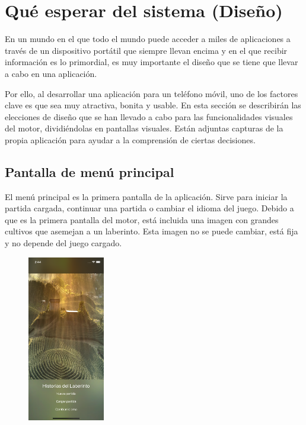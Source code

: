 \newpage
 
\section{Qué esperar del sistema (Diseño)} \label{designSection}
En un mundo en el que todo el mundo puede acceder a miles de aplicaciones a través de un dispositivo portátil que siempre llevan encima y en el que recibir información es lo primordial, es muy importante el diseño que se tiene que llevar a cabo en una aplicación.

Por ello, al desarrollar una aplicación para un teléfono móvil, uno de los factores clave es que sea muy atractiva, bonita y usable.
En esta sección se describirán las elecciones de diseño que se han llevado a cabo para las funcionalidades visuales del motor, dividiéndolas en pantallas visuales. Están adjuntas capturas de la propia aplicación para ayudar a la comprensión de ciertas decisiones.

\subsection{Pantalla de menú principal}
El menú principal es la primera pantalla de la aplicación. Sirve para iniciar la partida cargada, continuar una partida o cambiar el idioma del juego. Debido a que es la primera pantalla del motor, está incluida una imagen con grandes cultivos que asemejan a un laberinto. Esta imagen no se puede cambiar, está fija y no depende del juego cargado.

\begin{figure}[h]
	\centering
	\includegraphics[width=0.3\textwidth]{include/snapshots/mainMenu-es.png}
\end{figure}

